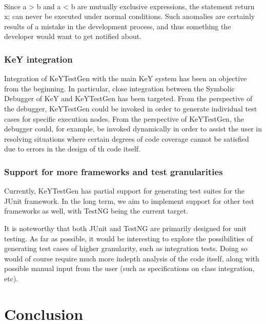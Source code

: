 \documentclass{article}
\begin{document}
\ \



Since a > b and a < b are mutually exclusive expressions, the statement
return x; can never be executed under normal conditions. Such anomalies are
certainly results of a mistake in the development process, and thus something
the developer would want to get notified about.



\subsubsection{KeY integration}

Integration of KeYTestGen with the main KeY system has been an objective from
the beginning. In particular, close integration between the Symbolic Debugger
of KeY and KeYTestGen has been targeted. From the perspective of the debugger,
KeYTestGen could be invoked in order to generate individual test cases for
specific execution nodes. From the perspective of KeYTestGen, the debugger
could, for example, be invoked dynamically in order to assist the user in
resolving situations where certain degrees of code coverage cannot be
satisfied due to errors in the design of th code itself.



\subsubsection{Support for more frameworks and test granularities}

Currently, KeYTestGen has partial support for generating test suites for the
JUnit framework. In the long term, we aim to implement support for other test
frameworks as well, with TestNG {\cite{TestNGwebsite}} being the current
target.



It is noteworthy that both JUnit and TestNG are primarily designed for unit
testing. As far as possible, it would be interesting to explore the
possibilities of generating test cases of higher granularity, such as
integration tests. Doing so would of course require much more indepth analysis
of the code itself, along with possible manual input from the user (such as
specifications on class integration, etc).

\section{Conclusion}
\end{document}
